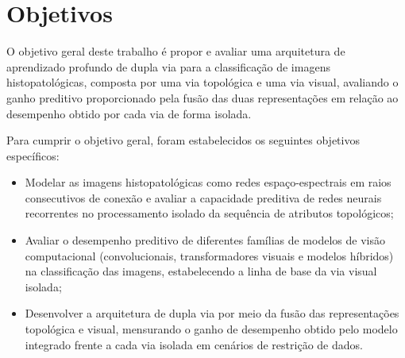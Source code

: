 \section{Objetivos}
\label{sec:objetivos}

O objetivo geral deste trabalho é propor e avaliar uma arquitetura de aprendizado profundo de dupla via para a classificação de imagens histopatológicas, composta por uma via topológica e uma via visual, avaliando o ganho preditivo proporcionado pela fusão das duas representações em relação ao desempenho obtido por cada via de forma isolada.

Para cumprir o objetivo geral, foram estabelecidos os seguintes objetivos específicos:

\begin{itemize}
    \item Modelar as imagens histopatológicas como redes espaço-espectrais em raios consecutivos de conexão e avaliar a capacidade preditiva de redes neurais recorrentes no processamento isolado da sequência de atributos topológicos;
    \item Avaliar o desempenho preditivo de diferentes famílias de modelos de visão computacional (convolucionais, transformadores visuais e modelos híbridos) na classificação das imagens, estabelecendo a linha de base da via visual isolada;
    \item Desenvolver a arquitetura de dupla via por meio da fusão das representações topológica e visual, mensurando o ganho de desempenho obtido pelo modelo integrado frente a cada via isolada em cenários de restrição de dados.
\end{itemize}

